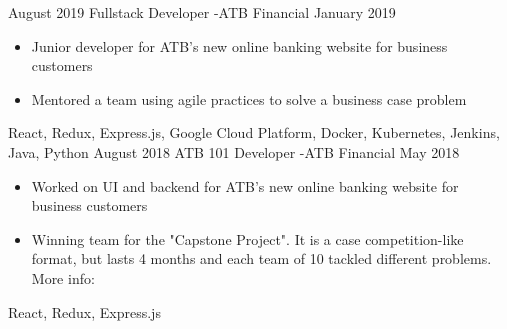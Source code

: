 
\begin{experiences}
  \experience
    {August 2019}   {Fullstack Developer -}{ATB Financial}{}
    {January 2019} {
                      \begin{itemize}
                        \item Junior developer for ATB's new online banking website for business customers
                        \item Mentored a team using agile practices to solve a business case problem
                      \end{itemize}
                    }
                    {
                        React,
                        Redux,
                        Express.js,
                        Google Cloud Platform,
                        Docker,
                        Kubernetes,
                        Jenkins,
                        Java,
                        Python
                    }
  \emptySeparator
  \experience
  {August 2018}   {ATB 101 Developer -}{ATB Financial}{}
  {May 2018} {
                    \begin{itemize}
                      \item Worked on UI and backend for ATB's new online banking website for business customers
                      \item Winning team for the "Capstone Project". It is a case competition-like format,
                      but lasts 4 months and each team of 10 tackled different problems.
                      More info: 
                    \end{itemize}
                  }
                  {
                      React,
                      Redux,
                      Express.js
                  }
\end{experiences}
